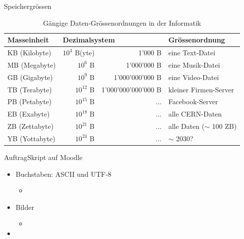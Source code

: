 \begin{frame}{Speichergrössen}
	\begin{table}[H]
		\footnotesize
		\centering
		\begin{tabular}{@{}l|rr|l@{}}
			\toprule
			\textbf{Masseinheit} & \multicolumn{2}{l|}{\textbf{Dezimalsystem}} & Grössenordnung                                   \\ \midrule
			KB (Kilobyte)        & $10^3$ B(yte)                               & 1’000 B             & eine Text-Datei            \\
			MB (Megabyte)        & $10^6$ B                                    & 1’000’000 B         & eine Musik-Datei           \\
			GB (Gigabyte)        & $10^9$ B                                    & 1'000'000'000 B     & eine Video-Datei           \\
			TB (Terabyte)        & $10^{12}$ B                                 & 1'000'000'000'000 B & kleiner Firmen-Server      \\
			PB (Petabyte)        & $10^{15}$ B                                 & ...                 & Facebook-Server            \\
			EB (Exabyte)         & $10^{18}$ B                                 & ...                 & alle CERN-Daten            \\
			ZB (Zettabyte)       & $10^{21}$ B                                 & ...                 & alle Daten ($\sim$ 100 ZB) \\
			YB (Yottabyte)       & $10^{24}$ B                                 & ...                 & $\sim$ 2030?               \\ \bottomrule
		\end{tabular}
		\caption*{Gängige Daten-Grössenordnungen in der Informatik}
	\end{table}
\end{frame}

\begin{frame}[fragile]{Auftrag}{Skript auf Moodle}
	\begin{itemize}
		\item Buchstaben: \acrshort{ASCII} und \acrshort{UTF-8}
		\begin{itemize}
			\item {}
		\end{itemize}
		\item Bilder
		\begin{itemize}
			\item {} 
		\end{itemize}
		\item {}
	\end{itemize}
\end{frame}